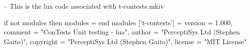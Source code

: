 
\startchapter[title=Preamble]

\startMkIVCode[default]


%
%
\stopMkIVCode

\startMkIVCode
{}

\unprotect

\stopMkIVCode

\startLuaCode
-- This is the lua code associated with t-contests.mkiv

if not modules then modules = { } end modules ['t-contests'] = {
    version   = 1.000,
    comment   = "ConTests Unit testing - lua",
    author    = "PerceptiSys Ltd (Stephen Gaito)",
    copyright = "PerceptiSys Ltd (Stephen Gaito)",
    license   = "MIT License"
}

